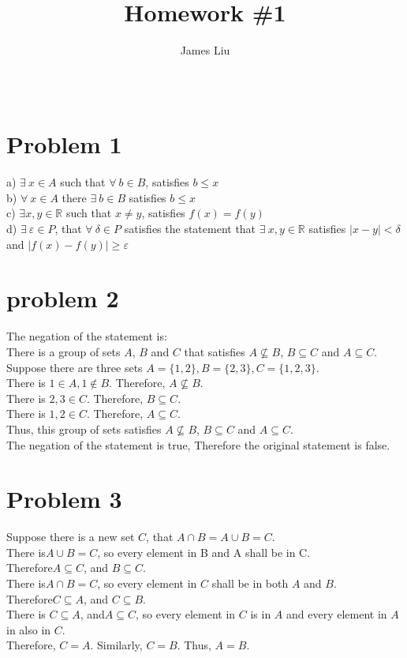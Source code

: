 \documentclass{article}
\begin{document}
\title{\textbf{Homework \#1 }}
\author{James Liu}
\date{\ }
\maketitle

\section*{Problem 1}
    
    a) \( \exists \ x\in A\) such that \(\forall \ b \in B\), satisfies \(b \le x\)\\
    b) \( \forall \ x \in A\) there \( \exists \ b\in B\) satisfies \(b \le x\)\\
    c) \( \exists x,y \in \mathbb{R}\) such that \(x\neq y\), satisfies \(f(x)=f(y)\)\\
    d) \( \exists \ \varepsilon \in P\), that \( \forall \ \delta \in P\) satisfies the
    statement that \(\exists \ x,y \in \mathbb{R}\) satisfies \(|x-y| < \delta\) and \(|f(x)-f(y)|\geq \varepsilon\)
\section*{problem 2}
    The negation of the statement is: \\
    There is a group of sets \(A\), \(B\) and \(C\) that satisfies \(A\nsubseteq B\), \(B \subseteq C\) and \(A \subseteq C\).
    Suppose there are three sets \(A=\{1,2\}, B=\{2,3\},C=\{1,2,3\}\). \\ 
    There is \(1 \in A, 1\notin B\). Therefore, \(A \nsubseteq B\).\\
    There is \(2,3 \in C\). Therefore, \(B \subseteq C\).\\
    There is \(1,2 \in C\). Therefore, \(A \subseteq C\).\\
    Thus, this group of sets satisfies \(A\nsubseteq B\), \(B \subseteq C\) and \(A \subseteq C\).\\
    The negation of the statement is true, Therefore the original statement is false.
\section*{Problem 3}
    Suppose there is a new set \(C\), that \(A\cap B = A\cup B = C\).\\
    There is\(A\cup B =C\), so every element in B and A shall be in C. \\
    Therefore\(A\subseteq C\), and \(B \subseteq C\).\\
    There is\(A\cap B =C\), so every element in \(C\) shall be in both \(A\) and \(B\).\\
    Therefore\(C\subseteq A\), and \(C \subseteq B\).\\
    There is \(C\subseteq A\), and\(A \subseteq C\), so every element in \(C\) is in \(A\) and every element in \(A\) in also in \(C\).\\
    Therefore, \(C = A\). Similarly, \(C = B\). Thus, \(A=B\).
\end{document}
